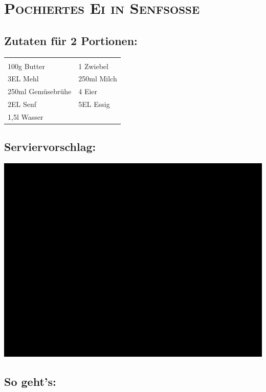 \section{\textsc{Pochiertes Ei in Senfsoße}}

\subsection*{Zutaten für 2 Portionen:}

\begin{tabular}{p{7.5cm} p{7.5cm}}
	& \\
	100g Butter & 1 Zwiebel \\
	3EL Mehl & 250ml Milch \\
  250ml Gemüsebrühe & 4 Eier \\
  2EL Senf & 5EL Essig \\
  1,5l Wasser &
\end{tabular}

\subsection*{Serviervorschlag:}

\includegraphics[width=\textwidth]{img/ph.jpg} \cite{eisenfsosse}

\subsection*{So geht's:}

